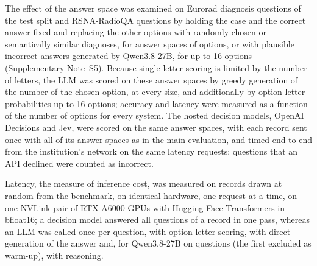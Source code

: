 \documentclass[11pt]{article}
\begin{document}
The effect of the answer space was examined on  Eurorad diagnosis questions of the test split and  RSNA-RadioQA questions by holding the case and the correct answer fixed and replacing the other options with randomly chosen or semantically similar diagnoses, for answer spaces of  options, or with plausible incorrect answers generated by Qwen3.8-27B, for up to 16 options (Supplementary Note~S5). Because single-letter scoring is limited by the number of letters, the LLM was scored on these answer spaces by greedy generation of the number of the chosen option, at every size, and additionally by option-letter probabilities up to 16 options; accuracy and latency were measured as a function of the number of options for every system. The hosted decision models, OpenAI Decisions and Jev, were scored on the same answer spaces, with each record sent once with all of its answer spaces as in the main evaluation, and timed end to end from the institution's network on the same latency requests; questions that an API declined were counted as incorrect.

Latency, the measure of inference cost, was measured on  records drawn at random from the benchmark, on identical hardware, one request at a time, on one NVLink pair of RTX A6000 GPUs with Hugging Face Transformers in bfloat16; a decision model answered all questions of a record in one pass, whereas an LLM was called once per question, with option-letter scoring, with direct generation of the answer and, for Qwen3.8-27B on  questions (the first excluded as warm-up), with reasoning.
\end{document}

